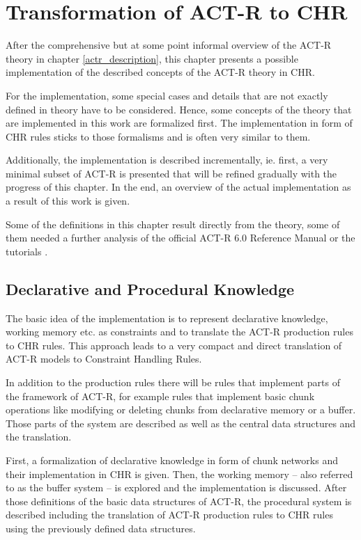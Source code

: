 \chapter{Transformation of ACT-R to CHR}

After the comprehensive but at some point informal overview of the ACT-R theory in chapter \ref{actr_description}, this chapter presents a possible implementation of the described concepts of the ACT-R theory in CHR.

For the implementation, some special cases and details that are not exactly defined in theory have to be considered. Hence, some concepts of the theory that are implemented in this work are formalized first. The implementation in form of CHR rules sticks to those formalisms and is often very similar to them.

Additionally, the implementation is described incrementally, ie. first, a very minimal subset of ACT-R is presented that will be refined gradually with the progress of this chapter. In the end, an overview of the actual implementation as a result of this work is given.

Some of the definitions in this chapter result directly from the theory, some of them needed a further analysis of the official ACT-R 6.0 Reference Manual \cite{actr_reference} or the tutorials \cite{actr_tutorial}. 

\section{Declarative and Procedural Knowledge}

The basic idea of the implementation is to represent declarative knowledge, working memory etc. as constraints and to translate the ACT-R production rules to CHR rules. This approach leads to a very compact and direct translation of ACT-R models to Constraint Handling Rules.

In addition to the production rules there will be rules that implement parts of the framework of ACT-R, for example rules that implement basic chunk operations like modifying or deleting chunks from declarative memory or a buffer. Those parts of the system are described as well as the central data structures and the translation.

First, a formalization of declarative knowledge in form of chunk networks and their implementation in CHR is given. Then, the working memory -- also referred to as the buffer system -- is explored and the implementation is discussed. After those definitions of the basic data structures of ACT-R, the procedural system is described including the translation of ACT-R production rules to CHR rules using the previously defined data structures.

